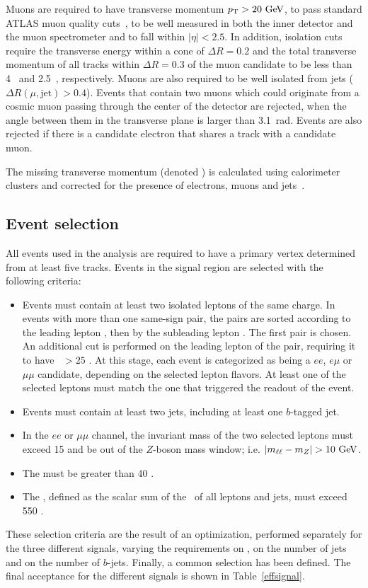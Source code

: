 Muons are required to have transverse momentum $\pt>20 \GeV$, to pass standard ATLAS muon quality
cuts~\cite{ATLAS-CONF-2011-063}, to be well measured in both the inner detector and the muon 
spectrometer and to fall within $|\eta|<2.5$. In addition, isolation cuts require the transverse energy 
within a cone of $\Delta R = 0.2$ and the total transverse momentum of all tracks within $\Delta R = 0.3$
of the muon candidate to be less than 4~\GeV{} and 2.5~\GeV{}, respectively. 
Muons are also required to be well isolated from jets ($\Delta R(\mu,\mathrm{jet})>0.4$).
Events that contain two muons which could originate from a cosmic muon passing
through the center of the detector are rejected, when the angle between them in the transverse plane
is larger than 3.1~rad. Events are also rejected if there is a candidate electron that shares a track
with a candidate muon.

The missing transverse momentum (denoted \met{}) is calculated using calorimeter clusters and corrected
for the presence of electrons, muons and jets~\cite{Aad:2012re}.

\subsection{Event selection}\label{sect:selection}
All events used in the analysis are required to have a primary vertex
determined from at least five tracks.
Events in the signal region are selected with the following criteria:
\begin{itemize}
\item Events must contain at least two isolated leptons of the same charge. In events with more than one
  same-sign pair, the pairs are sorted according to the leading lepton
  \pT, then by the subleading lepton \pT. The first pair is chosen. An additional cut
  is performed on the leading lepton of the pair, requiring it to have \pT\ $>25$ \GeV{}. At this
  stage, each event is categorized as being a $ee$, $e\mu$ or $\mu\mu$ candidate, depending on the
  selected lepton flavors. At least one of the selected leptons must match the one that triggered
  the readout of the event.
\item Events must contain at least two jets, including at least one $b$-tagged jet.
\item In the $ee$ or $\mu\mu$ channel, the invariant mass of the two selected leptons must exceed 15 \GeV{} and be out of the $Z$-boson mass window; i.e. $|m_{\ell\ell} - m_Z| > 10 \GeV$.
\item The \met{} must be greater than 40 \GeV{}.
\item The \HT{}, defined as the scalar sum of the \pt\  of all leptons and jets, must exceed 550 \GeV{}.
\end{itemize}
These selection criteria are the result of an optimization, performed separately for the three different
signals, varying the requirements on \HT{}, on the number of jets and on the number of $b$-jets.
Finally, a common selection has been defined. The final acceptance for the different
signals is shown in Table~\ref{effsignal}.

